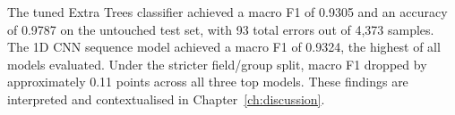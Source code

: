 The tuned Extra Trees classifier achieved a macro F1 of 0.9305 and
an accuracy of 0.9787 on the untouched test set, with 93 total errors
out of 4,373 samples. The 1D CNN sequence model achieved a macro F1
of 0.9324, the highest of all models evaluated. Under the stricter
field/group split, macro F1 dropped by approximately 0.11 points
across all three top models. These findings are interpreted and
contextualised in Chapter~\ref{ch:discussion}.
